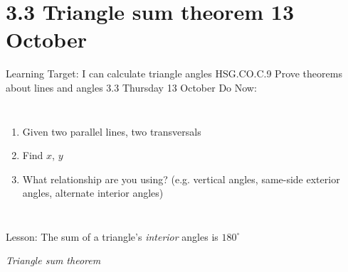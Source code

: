 \section{3.3 Triangle sum theorem \hfill 13 October}
\begin{frame}{Learning Target: I can calculate triangle angles}
{HSG.CO.C.9 Prove theorems about lines and angles  \hfill \alert{3.3 Thursday 13 October}}
  Do Now: 
  \begin{columns}
    \begin{enumerate}
      \item Given two parallel lines, two transversals
      \item Find $x$, $y$
      \item What relationship are you using? (e.g. vertical angles, same-side exterior angles, alternate interior angles)
    \end{enumerate}
  \end{columns} \vspace{0.8cm}
  Lesson: The sum of a triangle's \emph{interior} angles is $180^\circ$ \par \medskip 
  \hspace{1.2cm} \emph{Triangle sum theorem}
\end{frame}

